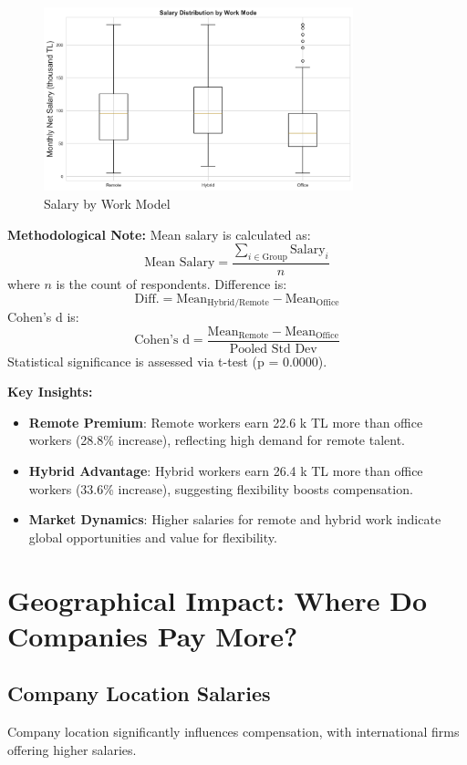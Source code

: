 \documentclass[12pt,a4paper]{article}
\begin{document}
\begin{figure}[H]
	\centering
	\includegraphics[width=0.8\textwidth]{figures/boxplot_work_mode.png}
	\caption{Salary by Work Model}
\end{figure}

\textbf{Methodological Note:}
Mean salary is calculated as:
\[
	\text{Mean Salary} = \frac{\sum_{i \in \text{Group}} \text{Salary}_i}{n}
\]
where \( n \) is the count of respondents. Difference is:
\[
	\text{Diff.} = \text{Mean}_{\text{Hybrid/Remote}} - \text{Mean}_{\text{Office}}
\]
Cohen’s d is:
\[
	\text{Cohen’s d} = \frac{\text{Mean}_{\text{Remote}} - \text{Mean}_{\text{Office}}}{\text{Pooled Std Dev}}
\]
Statistical significance is assessed via t-test (p = 0.0000).

\textbf{Key Insights:}
\begin{itemize}
	\item \textbf{Remote Premium}: Remote workers earn 22.6 k TL more than office workers (28.8\% increase), reflecting high demand for remote talent.
	\item \textbf{Hybrid Advantage}: Hybrid workers earn 26.4 k TL more than office workers (33.6\% increase), suggesting flexibility boosts compensation.
	\item \textbf{Market Dynamics}: Higher salaries for remote and hybrid work indicate global opportunities and value for flexibility.
\end{itemize}

\section{Geographical Impact: Where Do Companies Pay More?}

\subsection{Company Location Salaries}
Company location significantly influences compensation, with international firms offering higher salaries.
\end{document}
